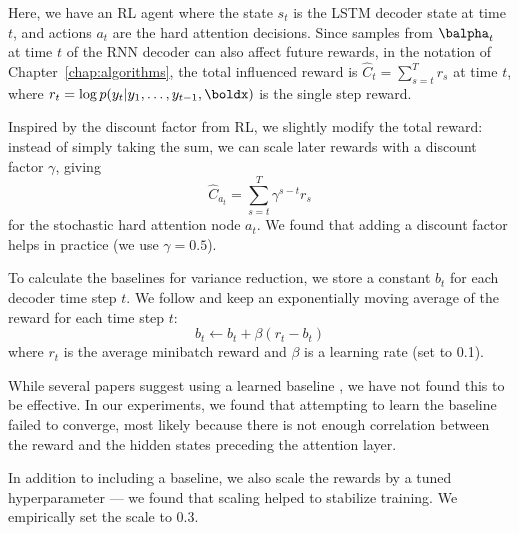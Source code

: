 \documentclass[12pt]{report}
\begin{document}
Here, we have an RL agent where the state $s_t$ is the LSTM decoder state at time $t$, and actions $a_t$ are the hard attention decisions.
Since samples from $\balpha_t$ at time $t$ of the RNN decoder can also affect future rewards, in the notation of Chapter~\ref{chap:algorithms}, the total influenced reward is $\hat{C}_t = \sum_{s = t}^T r_s$ at time $t$, where $r_t = \log p(y_t | y_1, \ldots, y_{t-1}, \boldx)$ is the single step reward.

Inspired by the discount factor from RL, we slightly modify the total reward: instead of simply taking the sum, we can scale later rewards with a discount factor $\gamma $, giving
\begin{equation}
\hat{C}_{a_t} = \sum_{s=t}^T \gamma^{s-t} r_s
\end{equation}
for the stochastic hard attention node $a_t$. We found that adding a discount factor helps in practice (we use $\gamma = 0.5$).

To calculate the baselines for variance reduction, we store a constant $b_t$ for each decoder time step $t$. We follow \citet{xu2015captioning} and keep an exponentially moving average of the reward for each time step $t$:
\begin{equation}
b_t \gets b_t + \beta (r_t - b_t)
\end{equation}
where $r_t$ is the average minibatch reward and $\beta$ is a learning rate (set to 0.1).

While several papers suggest using a learned baseline \citep[e.g.][]{mnih2014visualattention, ranzato2015}, we have not found this to be effective. In our experiments, we found that attempting to learn the baseline failed to converge, most likely because there is not enough correlation between the reward and the hidden states preceding the attention layer.

In addition to including a baseline, we also scale the rewards by a tuned hyperparameter --- we found that scaling helped to stabilize training. We empirically set the scale to 0.3.



\end{document}
